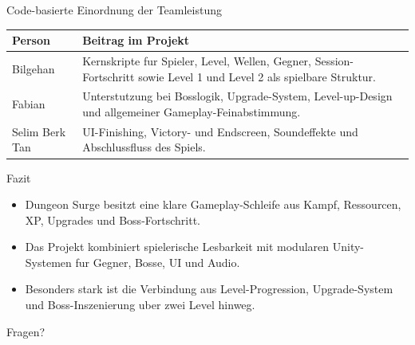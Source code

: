 \documentclass[aspectratio=169]{beamer}
\begin{document}
\begin{frame}{Code-basierte Einordnung der Teamleistung}
  \begin{table}
    \scriptsize
    \begin{tabular}{p{} p{}}
      \toprule
      Person & Beitrag im Projekt \\
      \midrule
      Bilgehan & Kernskripte fur Spieler, Level, Wellen, Gegner, Session-Fortschritt sowie Level 1 und Level 2 als spielbare Struktur. \\
      Fabian & Unterstutzung bei Bosslogik, Upgrade-System, Level-up-Design und allgemeiner Gameplay-Feinabstimmung. \\
      Selim Berk Tan & UI-Finishing, Victory- und Endscreen, Soundeffekte und Abschlussfluss des Spiels. \\
      \bottomrule
    \end{tabular}
  \end{table}
\end{frame}



\begin{frame}{Fazit}
  \begin{itemize}
    \item Dungeon Surge besitzt eine klare Gameplay-Schleife aus Kampf, Ressourcen, XP, Upgrades und Boss-Fortschritt.
    \item Das Projekt kombiniert spielerische Lesbarkeit mit modularen Unity-Systemen fur Gegner, Bosse, UI und Audio.
    \item Besonders stark ist die Verbindung aus Level-Progression, Upgrade-System und Boss-Inszenierung uber zwei Level hinweg.
  \end{itemize}

  \vspace{0.5cm}
  \centering
  \Large Fragen?
\end{frame}
\end{document}
